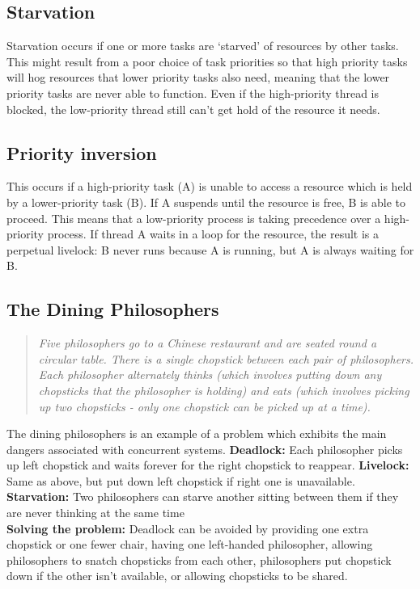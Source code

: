 \documentclass[a4paper,oneside]{report}
\begin{document}
    	\subsection{Starvation}
    	Starvation occurs if one or more tasks are `starved' of resources by other tasks. This might result from a poor choice of task priorities so that high priority tasks will hog resources that lower priority tasks also need, meaning that the lower priority tasks are never able to function. Even if the high-priority thread is blocked, the low-priority thread still can’t get hold of the resource it needs.
    	
    	\subsection{Priority inversion}
    	This occurs if a high-priority task (A) is unable to access a resource which is held by a lower-priority task (B). If A suspends until the resource is free, B is able to proceed. This means that a low-priority process is taking precedence over a high-priority process. If thread A waits in a loop for the resource, the result is a perpetual livelock: B never runs because A is running, but A is always waiting for B.
    	
    	\subsection{The Dining Philosophers}
    	\begin{quotation}\emph{
    	Five philosophers go to a Chinese restaurant and are seated round a circular table.  There is a single chopstick between each pair of philosophers. Each philosopher alternately thinks (which involves putting down any chopsticks that the philosopher is holding) and eats (which involves picking up two chopsticks - only one chopstick can be picked up at a time).}
    	\end{quotation}
    	
    	The dining philosophers is an example of a problem which exhibits the main dangers associated with concurrent systems. \textbf{Deadlock:} Each philosopher picks up left chopstick and waits forever for the right chopstick to reappear. \textbf{Livelock:} Same as above, but put down left chopstick if right one is unavailable. \textbf{Starvation:} Two philosophers can starve another sitting between them if they are never thinking at the same time\\
    	
\textbf{Solving the problem:} Deadlock can be avoided by providing one extra chopstick or one fewer chair, having one left-handed philosopher, allowing philosophers to snatch chopsticks from each other, philosophers put chopstick down if the other isn’t available, or allowing chopsticks to be shared.   
    	 
\end{document}
